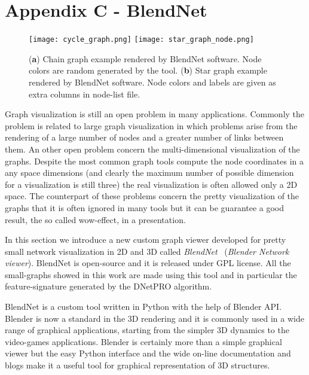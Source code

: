 \documentclass{standalone}
\begin{document}
\chapter*{Appendix C - BlendNet}

\begin{figure}[htbp]
\centering
\texttt{[image: cycle\_graph.png]}
\qquad\qquad
\texttt{[image: star\_graph\_node.png]}
\caption{(\textbf{a}) Chain graph example rendered by BlendNet software.
Node colors are random generated by the tool.
(\textbf{b}) Star graph example rendered by BlendNet software.
Node colors and labels are given as extra columns in node-list file.
}
\label{fig:blendnet}
\end{figure}

Graph visualization is still an open problem in many applications.
Commonly the problem is related to large graph visualization in which problems arise from the rendering of a large number of nodes and a greater number of links between them.
An other open problem concern the multi-dimensional visualization of the graphs.
Despite the most common graph tools compute the node coordinates in a any space dimensions (and clearly the maximum number of possible dimension for a visualization is still three) the real visualization is often allowed only a 2D space.
The counterpart of these problems concern the pretty visualization of the graphs that it is often ignored in many tools but it can be guarantee a good result, the so called wow-effect, in a presentation.

In this section we introduce a new custom graph viewer developed for pretty small network visualization in 2D and 3D called \emph{BlendNet}~\cite{BlendNet} (\emph{Blender Network viewer}).
BlendNet is open-source and it is released under GPL license.
All the small-graphs showed in this work are made using this tool and in particular the feature-signature generated by the DNetPRO algorithm.

BlendNet is a custom tool written in Python with the help of Blender API.
Blender is now a standard in the 3D rendering and it is commonly used in a wide range of graphical applications, starting from the simpler 3D dynamics to the video-games applications.
Blender is certainly more than a simple graphical viewer but the easy Python interface and the wide on-line documentation and blogs make it a useful tool for graphical representation of 3D structures.
\end{document}
